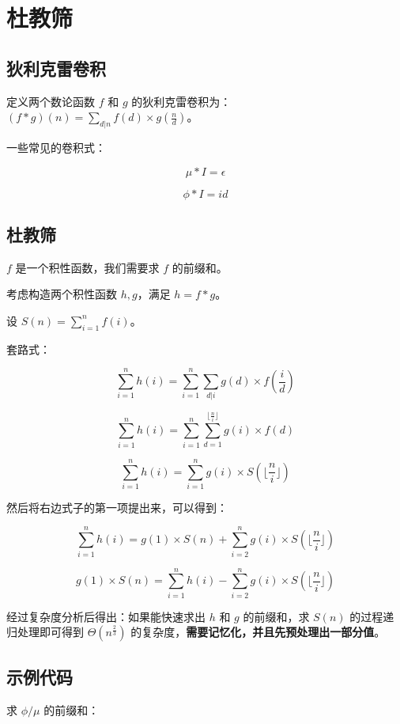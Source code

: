 \section{杜教筛}

\subsection{狄利克雷卷积}

定义两个数论函数 $f$ 和 $g$ 的狄利克雷卷积为：$(f*g)(n)=\sum_{d|n}f(d) \times g(\frac{n}{d})$。

一些常见的卷积式：

$$\mu*I=\epsilon$$

$$\phi*I=id$$

\subsection{杜教筛}

$f$ 是一个积性函数，我们需要求 $f$ 的前缀和。

考虑构造两个积性函数 $h,g$，满足 $h=f*g$。

设 $S(n)=\sum_{i=1}^n f(i)$。

套路式：

$$\sum_{i=1}^n h(i)=\sum_{i=1}^n\sum_{d|i}g(d) \times f(\frac{i}{d})$$

$$\sum_{i=1}^n h(i)=\sum_{i=1}^n\sum_{d=1}^{\lfloor\frac{n}{i}\rfloor} g(i) \times f(d)$$

$$\sum_{i=1}^n h(i)=\sum_{i=1}^n g(i) \times S(\lfloor \frac{n}{i} \rfloor)$$

然后将右边式子的第一项提出来，可以得到：

$$\sum_{i=1}^n h(i)=g(1) \times S(n)+\sum_{i=2}^n g(i) \times S(\lfloor \frac{n}{i} \rfloor)$$

$$g(1) \times S(n)=\sum_{i=1}^n h(i)-\sum_{i=2}^n g(i) \times S(\lfloor \frac{n}{i} \rfloor)$$

经过复杂度分析后得出：如果能快速求出 $h$ 和 $g$ 的前缀和，求 $S(n)$ 的过程递归处理即可得到 $\Theta(n^{\frac{2}{3}})$ 的复杂度，\textbf{需要记忆化，并且先预处理出一部分值}。

\subsection{示例代码}

求 $\phi/\mu$ 的前缀和：

